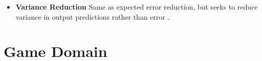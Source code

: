 \documentclass{sig-alternate}
\begin{document}
\begin{itemize}
\item \textbf{Variance Reduction} Same as expected error reduction, but seeks to reduce variance in output predictions rather than error \cite{settles2012:al-book}.
\end{itemize}



\section{Game Domain}
\end{document}
